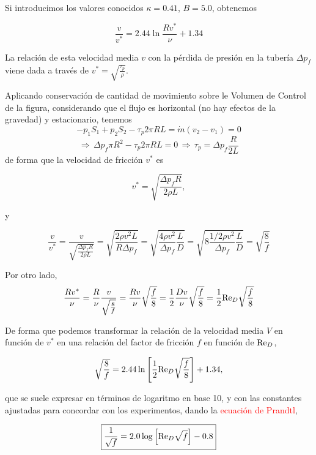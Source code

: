 Si introducimos los valores conocidos $\kappa = 0.41$, $B=5.0$, obtenemos

\begin{equation}
	\frac{v}{v^*} = 2.44 \ln \frac{R v^*}{\nu} + 1.34
\end{equation}


La relación de esta velocidad media $v$ con la pérdida de presión en la tubería $\Delta p_f$ viene dada a través de $v^* = \sqrt{\frac{\tau_p}{\rho}}$.


Aplicando conservación de cantidad de movimiento sobre le Volumen de Control de la figura, considerando que el flujo es horizontal (no hay efectos de la gravedad) y estacionario, tenemos
\[
- p_1 S_1 + p_2 S_2 - \tau_p 2\pi R L = \dot{m}(v_2-v_1) = 0
\]
\[
\Rightarrow \, \Delta p_f \pi R^2 - \tau_p 2\pi R L = 0 \,
\Rightarrow \, \tau_p = \Delta p_f \frac{R}{2 L}
\]
de forma que la velocidad de fricción $v^*$ es

\begin{equation}
	v^* = \sqrt{\frac{\Delta p_f R}{2 \rho L}},
\end{equation}

y

\begin{equation}
	\frac{v}{v^*} = \frac{v}{\sqrt{\frac{\Delta p_f R}{2 \rho L}}} = \sqrt{\frac{2 \rho v^2 L}{R \Delta p_f}} = \sqrt{\frac{4 \rho v^2}{\Delta p_f}\frac{L}{D}} =
\sqrt{8\frac{1/2 \rho v^2}{\Delta p_f}\frac{L}{D}} = \sqrt{\frac{8}{f}}
\end{equation}


Por otro lado,
\[
\frac{R v^*}{\nu} = \frac{R}{\nu} \frac{v}{\sqrt{\frac{8}{f}}} = \frac{R v}{\nu}
\sqrt{\frac{f}{8}}= \frac{1}{2}\frac{D v}{\nu}\sqrt{\frac{f}{8}} = \frac{1}{2}\text{Re}_D\sqrt{\frac{f}{8}}
\]

De forma que podemos transformar la relación de la velocidad media $V$ en función de $v^*$ en una relación del factor de fricción $f$ en función de $\text{Re}_D$,

\begin{equation}
	\sqrt{\frac{8}{f}} = 2.44 \ln \left[\frac{1}{2}\text{Re}_D \sqrt{\frac{f}{8}}\right] + 1.34,
\end{equation}

que se suele expresar en términos de logaritmo en base 10, y con las constantes ajustadas para concordar con los experimentos, dando la \textcolor{red}{ecuación de Prandtl},

\begin{equation}
	\boxed{
	\frac{1}{\sqrt{f}} = 2.0\log \left[ \text{Re}_D \sqrt{f}\right] - 0.8
}
\end{equation}

